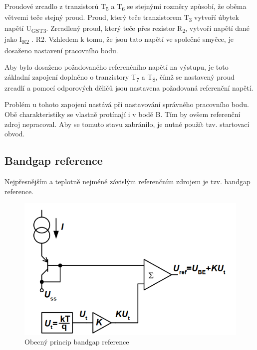 Proudové zrcadlo z tranzistorů T\textsubscript{5} a T\textsubscript{6} se stejnými rozměry způsobí, že oběma větvemi teče stejný proud. Proud, který teče tranzistorem T\textsubscript{3} vytvoří úbytek napětí U\textsubscript{GST3}. Zrcadlený proud, který teče přes rezistor R\textsubscript{2}, vytvoří napětí dané jako I\textsubscript{R2} . R2. Vzhledem k tomu, že jsou tato napětí ve společné smyčce, je dosaženo nastavení pracovního bodu.

Aby bylo dosaženo požadovaného referenčního napětí na výstupu, je toto základní zapojení doplněno o tranzistory T\textsubscript{7} a T\textsubscript{8}, čímž se nastavený proud zrcadlí a pomocí odporových děličů jsou nastavena požadovaná referenční napětí.

Problém u tohoto zapojení nastává při nastavování správného pracovního bodu. Obě charakteristiky se vlastně protínají i v bodě B. Tím by ovšem referenční zdroj nepracoval. Aby se tomuto stavu zabránilo, je nutné použít tzv. startovací obvod.

\subsection{Bandgap reference}
Nejpřesnějším a teplotně nejméně závislým referenčním zdrojem je tzv. bandgap reference.
\begin{figure}[h]
   \begin{center}
     \includegraphics[scale=0.6]{images/BG.png}
   \end{center}
   \caption{Obecný princip bandgap reference}
\end{figure}

